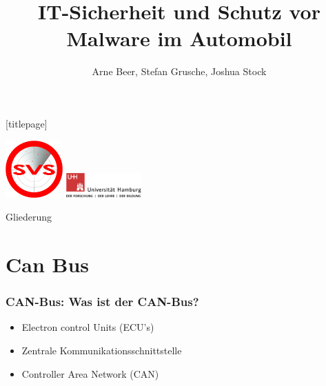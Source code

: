 \documentclass[t]{beamer}
\title{IT-Sicherheit und Schutz vor Malware im Automobil}
\author[Beer, Grusche, Stock]{Arne Beer, Stefan Grusche, Joshua Stock}
\date{}
\begin{document}
\begingroup
	[titlepage]
	\begin{frame}[plain]
		\vskip8mm
		\includegraphics[width=2.2cm]{pic/svs_logo_hires-ohne-was.png}
		\titlepage
		\vspace{\fill}
		\includegraphics[width=2.9cm]{pic/UHH-Logo_2010_Farbe_RGB_hires_nomargin.png}
		\vskip20pt
	\end{frame}
\endgroup

\begin{frame}{Gliederung}
	\tableofcontents
\end{frame}

\section{Can Bus}
\begin{frame}
	\frametitle{CAN-Bus: Was ist der CAN-Bus?}
	\begin{itemize}
        \item Electron control Units (ECU's)
		\item Zentrale Kommunikationsschnittstelle
        \item Controller Area Network (CAN)
	\end{itemize}
\end{frame}
\end{document}
